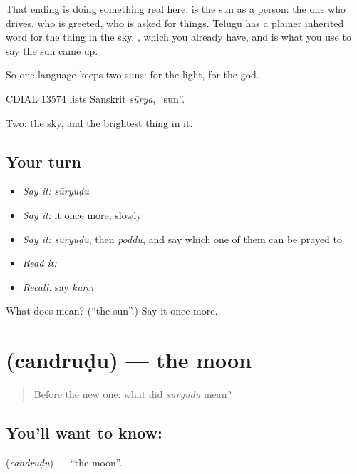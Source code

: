 That ending is doing something real here.  is the sun as a person: the one who drives, who is greeted, who is asked for things. Telugu has a plainer inherited word for the thing in the sky, , which you already have, and  is what you use to say the sun came up.

So one language keeps two suns:  for the light,  for the god.

CDIAL 13574 lists Sanskrit \emph{sūrya}, \textquotedblleft{}sun\textquotedblright{}.

\begin{grammarlens}[title={What you've built}]
Two: the sky, and the brightest thing in it.
\end{grammarlens}

\subsection*{Your turn}
\begin{itemize}
\raggedright
  \item \emph{Say it:} \emph{sūryuḍu}
  \item \emph{Say it:} it once more, slowly
  \item \emph{Say it:} \emph{sūryuḍu}, then \emph{poddu}, and say which one of them can be prayed to
  \item \emph{Read it:} \textbf{}
  \item \emph{Recall:} say \emph{kurcī}
\end{itemize}

\begin{tcolorbox}[breakable,colback=teal!4,colframe=teal!35!black,title={Before you move on}]
What does  mean? (\textquotedblleft{}the sun\textquotedblright{}.) Say it once more.
\end{tcolorbox}
\section[\texorpdfstring{\te{చంద్రుడు} (candruḍu)}{చంద్రుడు (candruḍu)}]{ (candruḍu) — the moon}

\label{lesson:TE-C53-moon}



\begin{quote}
Before the new one: what did \emph{sūryuḍu} mean?
\end{quote}

\subsection*{You'll want to know: }
\textbf{} (\emph{candruḍu}) — \textquotedblleft{}the moon\textquotedblright{}.

